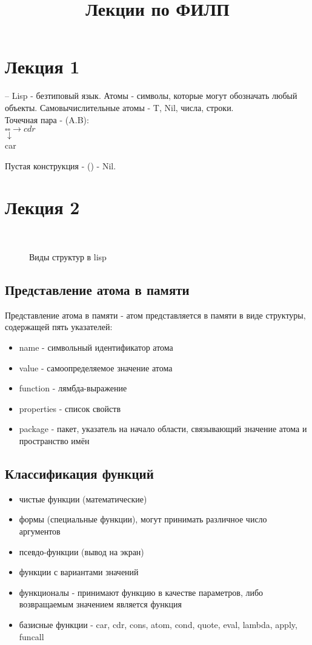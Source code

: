 \title{Лекции по ФИЛП}
\chapter{Лекция 1}--
Lisp - безтиповый язык. Атомы - символы, которые могут обозначать любый объекты. Самовычислительные атомы - T, Nil, числа, строки.\\

Точечная пара - (A.B):\\
$\square \square \rightarrow cdr$\\
$\downarrow$\\
car

Пустая конструкция - () - Nil.

\chapter{Лекция 2}\

\begin{figure}[H]
	\center{\texttt{[image: 0]}}
	\caption{Виды структур в lisp}
\end{figure}

\section{Представление атома в памяти}
Представление атома в памяти - атом представляется в памяти в виде структуры, содержащей пять указателей:
\begin{itemize}
\item name - символьный идентификатор атома
\item value - самоопределяемое значение атома
\item function - лямбда-выражение
\item properties - список свойств
\item package - пакет, указатель на начало области, связывающий значение атома и пространство имён
\end{itemize}

\section{Классификация функций}
\begin{itemize}
\item чистые функции (математические)
\item формы (специальные функции), могут принимать различное число аргументов
\item псевдо-функции (вывод на экран)
\item функции с вариантами значений
\item функционалы - принимают функцию в качестве параметров, либо возвращаемым значением является функция
\item базисные функции - car, cdr, cons, atom, cond, quote, eval, lambda, apply, funcall
\end{itemize}

